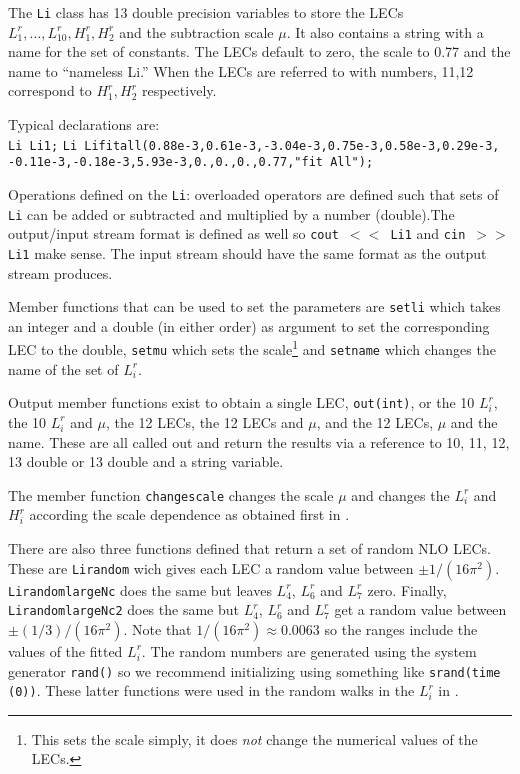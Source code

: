 \documentclass[12pt,a4paper]{article}
\begin{document}
The \texttt{Li} class has 13 double precision variables to store the
LECs $L_1^r,\ldots,L_{10}^r,H_1^r,H_2^r$ and the subtraction scale $\mu$.
It also contains a string with a name for the set of constants.
The LECs default to zero, the scale to 0.77 and the name to ``nameless Li.''
When the LECs are referred to with numbers, 11,12 correspond to $H_1^r,H_2^r$
respectively.


Typical declarations are:\\
\texttt{Li Li1;}
\texttt{Li Lifitall(0.88e-3,0.61e-3,-3.04e-3,0.75e-3,0.58e-3,0.29e-3,}\\
\texttt{-0.11e-3,\allowbreak-0.18e-3,5.93e-3,0.,0.,0.,0.77,"fit All");}

Operations defined on the \texttt{Li}: overloaded operators are defined
such that sets of \texttt{Li} can be added or subtracted and multiplied by
a number (double).The output/input stream format is defined as well so
\texttt{cout $<<$ Li1}
and \texttt{cin $>>$ Li1} make sense. The input stream should have the same
format as the output stream produces.

Member functions that can be used to set the parameters
are \texttt{setli} which takes an integer and a double (in either order) as
argument to set the corresponding LEC to the double, \texttt{setmu} which
sets the scale\footnote{This sets the scale simply, it does \emph{not} change
the numerical values of the LECs.}
 and \texttt{setname} which changes the name of the set of $L_i^r$.

Output member functions exist to obtain a single LEC, \texttt{out(int)},
or the 10 $L_i^r$, the 10 $L_i^r$ and $\mu$, the 12 LECs,
the 12 LECs and $\mu$, and the 12 LECs, $\mu$ and the name.
These are all called out and return the results via a reference to
10, 11, 12, 13 double or 13 double and a string variable.

The member function \texttt{changescale} changes the scale $\mu$ and changes
the $L_i^r$ and $H_i^r$ according the scale dependence as obtained first
in \cite{Gasser:1984gg}.

There are also three functions defined that return a set of random NLO LECs.
These are \texttt{Lirandom} wich gives each LEC a random value between
$\pm1/(16\pi^2)$. \texttt{LirandomlargeNc} does the same but leaves $L_4^r$,
$L_6^r$ and $L_7^r$ zero. Finally, \texttt{LirandomlargeNc2} does the same but 
$L_4^r$, $L_6^r$ and $L_7^r$ get a random value between $\pm(1/3)/(16\pi^2)$.
Note that $1/(16\pi^2)\approx 0.0063$ so the ranges include the values of the
fitted $L_i^r$. The random numbers are generated using the system
generator \texttt{rand()} so we recommend initializing using something like
\texttt{srand(time (0))}. These latter functions were used in the
random walks in the $L_i^r$ in \cite{Bijnens:2011tb}.
\end{document}
